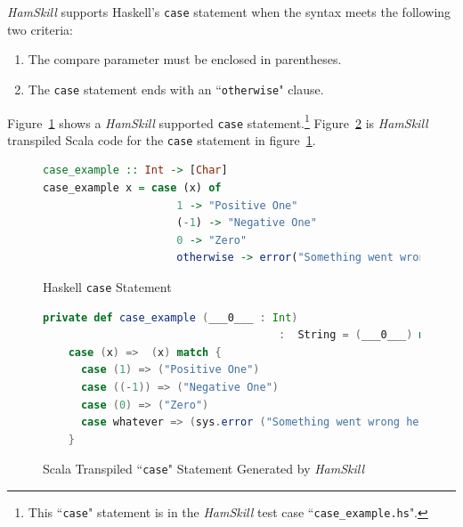 \documentclass{report}
\begin{document}
\textit{HamSkill} supports Haskell's \texttt{case} statement when the syntax meets the following two criteria:

\begin{enumerate}

\item The compare parameter must be enclosed in parentheses.

\item The \texttt{case} statement ends with an ``\texttt{otherwise}" clause.

\end{enumerate}

Figure~\ref{fig:haskellCaseStatement} shows a \textit{HamSkill} supported \texttt{case} statement.\footnote{This ``\texttt{case}" statement is in the \textit{HamSkill} test case ``\texttt{case\_example.hs}".}  Figure~\ref{fig:scalaCaseStatement} is \textit{HamSkill} transpiled Scala code for the \texttt{case} statement in figure~\ref{fig:haskellCaseStatement}.

\begin{figure}[H]
\begin{mdframed}
\begin{lstlisting}[language=Haskell, basicstyle=\scriptsize, showstringspaces=false]
case_example :: Int -> [Char]
case_example x = case (x) of
                     1 -> "Positive One"
                     (-1) -> "Negative One"
                     0 -> "Zero"
                     otherwise -> error("Something went wrong here")
\end{lstlisting}
\end{mdframed}
\caption{Haskell \texttt{case} Statement}\label{fig:haskellCaseStatement}
\end{figure}

\begin{figure}[H]
\begin{mdframed}
\begin{lstlisting}[language=Scala, basicstyle=\scriptsize]
private def case_example (___0___ : Int) 
                                     :  String = (___0___) match {
    case (x) =>  (x) match {
      case (1) => ("Positive One")
      case ((-1)) => ("Negative One")
      case (0) => ("Zero")
      case whatever => (sys.error ("Something went wrong here"))
    }
\end{lstlisting}
\end{mdframed}
\caption{Scala Transpiled ``\texttt{case}" Statement Generated by \textit{HamSkill}}\label{fig:scalaCaseStatement}
\end{figure}
\end{document}
